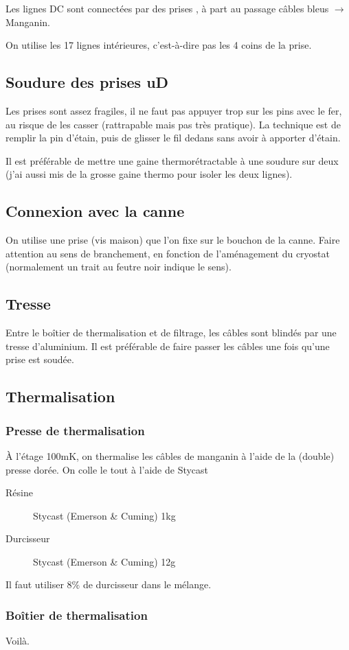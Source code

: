 Les lignes DC sont connectées par des prises \uD, à part au passage câbles bleus $\rightarrow$ Manganin.

On utilise les 17 lignes intérieures, c'est-à-dire pas les 4 coins de la prise.

\subsection{Soudure des prises uD}
Les prises \uD sont assez fragiles, il ne faut pas appuyer trop sur les pins avec le fer, au risque de les casser (rattrapable mais pas très pratique). La technique est de remplir la pin d'étain, puis de glisser le fil dedans sans avoir à apporter d'étain.

Il est préférable de mettre une gaine thermorétractable à une soudure sur deux (j’ai aussi mis de la grosse gaine thermo pour isoler les deux lignes).


\subsection{Connexion avec la canne}
On utilise une prise \uD (vis maison) que l'on fixe sur le bouchon de la canne. Faire attention au sens de branchement, en fonction de l'aménagement du cryostat (normalement un trait au feutre noir indique le sens).

\subsection{Tresse}
Entre le boîtier de thermalisation et de filtrage, les câbles sont blindés par une tresse d'aluminium. Il est préférable de faire passer les câbles une fois qu'une prise \uD est soudée.

\subsection{Thermalisation}
\subsubsection{Presse de thermalisation}
À l'étage 100mK, on thermalise les câbles de manganin à l'aide de la (double) presse dorée. On colle le tout à l'aide de Stycast

\begin{description}
    \item[Résine] Stycast (Emerson \& Cuming) 1kg
    \item[Durcisseur] Stycast (Emerson \& Cuming) 12g
\end{description}
Il faut utiliser $8\%$ de durcisseur dans le mélange.

\subsubsection{Boîtier de thermalisation}
Voilà.

